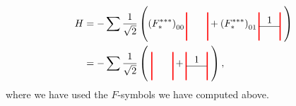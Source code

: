 	\begin{align}
		H&=-\sum \frac{1}{\sqrt{2}}\left(\left(F_*^{***}\right)_{00}
		\begin{tikzpicture}[scale=0.5,baseline=(current bounding box.center)]
			\draw[red,line width=0.4mm] (0,0) -- (0,2);
			\draw[red,line width=0.4mm] (1.5,0) -- (1.5,2);
		\end{tikzpicture}+\left(F_*^{***}\right)_{01}
		\begin{tikzpicture}[scale=0.5,baseline=(current bounding box.center)]
			\draw[red,line width=0.4mm] (0,0) -- (0,2);
			\draw (0,1) to node[above] {$1$} (1.5,1);
			\draw[red,line width=0.4mm] (1.5,0) -- (1.5,2);
		\end{tikzpicture}\ \right)\\
		&=-\sum\frac{1}{\sqrt{2}}\left(\ 
		\begin{tikzpicture}[scale=0.5,baseline=(current bounding box.center)]
			\draw[red,line width=0.4mm] (0,0) -- (0,2);
			\draw[red,line width=0.4mm] (1.5,0) -- (1.5,2);
		\end{tikzpicture}+
		\begin{tikzpicture}[scale=0.5,baseline=(current bounding box.center)]
			\draw[red,line width=0.4mm] (0,0) -- (0,2);
			\draw (0,1) to node[above] {$1$} (1.5,1);
			\draw[red,line width=0.4mm] (1.5,0) -- (1.5,2);
		\end{tikzpicture}\ \right),
	\end{align}
where we have used the $F$-symbols we have computed above. 

